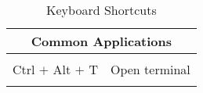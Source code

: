 \begin{table}[ht!]
\begin{tabular}{|l|p{10cm}|}
 	\hline 	
 	\multicolumn{2}{|c|}{\textbf{Common Applications}} \\
 	\hline
 	& \\
 	Ctrl $+$ Alt $+$ T		& Open terminal \\
 	& \\
 	
 	
	\hline
	\end{tabular}
	\label{tab:keyboard-shortcuts}
	\caption{Keyboard Shortcuts}
\end{table}